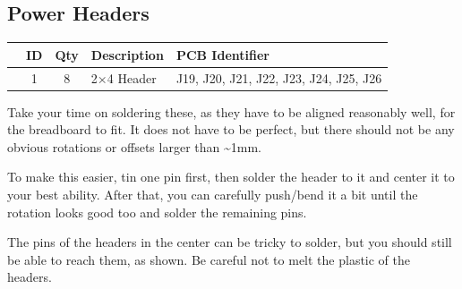 \documentclass[12pt, a4paper]{article}
\newcommand{\checkbox}[1]{\CheckBox[backgroundcolor=0.86 0.828 0.71, name=#1]{}}
\begin{document}
\pagebreak

\subsection{Power Headers}

\begin{center}
    \small
    \setlength\extrarowheight{8pt}
    \begin{tabularx}{\textwidth}{|c|c|c|X|l|}
        \hline\rowcolor{lightgray} & ID & Qty & Description & PCB Identifier\\
        \hline\checkbox{fa} & 1 & 8 & 2×4 Header & J19, J20, J21, J22, J23, J24, J25, J26\\
        \hline
    \end{tabularx}
\end{center}

Take your time on soldering these, as they have to be aligned reasonably well, for the
breadboard to fit. It does not have to be perfect, but there should not be any obvious
rotations or offsets larger than \textasciitilde1mm.

To make this easier, tin one pin first, then solder the header to it and center it to your best
ability. After that, you can carefully push/bend it a bit until the rotation looks good too and
solder the remaining pins.

The pins of the headers in the center can be tricky to solder, but you should still be able to
reach them, as shown. Be careful not to melt the plastic of the headers.
\end{document}
